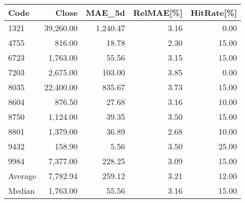 \begingroup
\footnotesize
\begin{tabular}{lrrrr}
\hline
Code & Close & MAE\_5d & RelMAE[\%] & HitRate[\%] \\
\hline
1321 & 39,260.00 & 1,240.47 & 3.16 & 0.00 \\
4755 & 816.00 & 18.78 & 2.30 & 15.00 \\
6723 & 1,763.00 & 55.56 & 3.15 & 15.00 \\
7203 & 2,675.00 & 103.00 & 3.85 & 0.00 \\
8035 & 22,400.00 & 835.67 & 3.73 & 15.00 \\
8604 & 876.50 & 27.68 & 3.16 & 10.00 \\
8750 & 1,124.00 & 39.35 & 3.50 & 15.00 \\
8801 & 1,379.00 & 36.89 & 2.68 & 10.00 \\
9432 & 158.90 & 5.56 & 3.50 & 25.00 \\
9984 & 7,377.00 & 228.25 & 3.09 & 15.00 \\
Average & 7,782.94 & 259.12 & 3.21 & 12.00 \\
Median & 1,763.00 & 55.56 & 3.16 & 15.00 \\
\hline
\end{tabular}
\endgroup